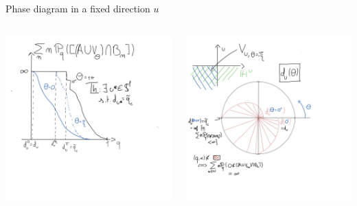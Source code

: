 \begin{frame}{Phase diagram in a fixed direction $u$}
\begin{columns}
\begin{column}{0.4\textwidth}
     \includegraphics[width=\textwidth]{decay_theta.jpg}
\end{column}
\begin{column}{0.6\textwidth}  
    \begin{center}
     \includegraphics[width=1.1\textwidth]{diag_theta.jpg}
     \end{center}
\end{column}
\end{columns}
\end{frame}

